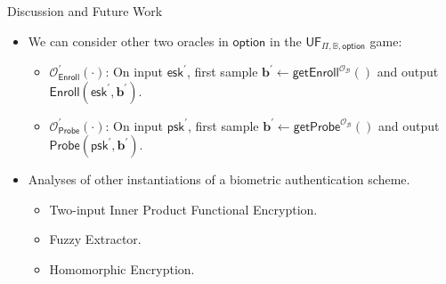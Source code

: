 \begin{frame}{Discussion and Future Work}

\begin{itemize}

	\item<1-> We can consider other two oracles in $\textsf{option}$ in the $\textsf{UF}_{\Pi, \mathbb{B}, \textsf{option}}$ game:
	\begin{itemize}
		\item<2-> $\mathcal{O}_{\textsf{Enroll}}^\prime (\cdot)$: On input $\textsf{esk}^\prime$, first sample $\mathbf{b}^\prime \gets \textsf{getEnroll}^{\mathcal{O}_{\mathcal{B}}}()$ and output $\textsf{Enroll}(\textsf{esk}^\prime, \mathbf{b}^\prime)$.

		\item<2-> $\mathcal{O}_{\textsf{Probe}}^\prime (\cdot)$: On input $\textsf{psk}^\prime$, first sample $\mathbf{b}^\prime \gets \textsf{getProbe}^{\mathcal{O}_{\mathcal{B}}}()$ and output $\textsf{Probe}(\textsf{psk}^\prime, \mathbf{b}^\prime)$.
	\end{itemize}

	\item<4-> Analyses of other instantiations of a biometric authentication scheme.
	\begin{itemize}
		\item<5-> Two-input Inner Product Functional Encryption.
		\item<5-> Fuzzy Extractor.
		\item<5-> Homomorphic Encryption.
	\end{itemize}

\end{itemize}

\end{frame}
